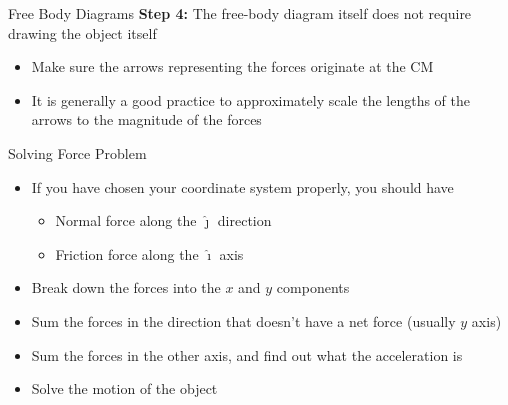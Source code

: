 \documentclass[12pt,compress,aspectratio=169]{beamer}
\newcommand{\mb}[1]{\ensuremath\mathbf{#1}}
\begin{document}
\begin{frame}{Free Body Diagrams}
  \textbf{Step 4:} The free-body diagram itself does not require drawing the
  object itself
  \begin{itemize}
  \item Make sure the arrows representing the forces originate at the CM
  \item It is generally a good practice to approximately scale the lengths of
    the arrows to the magnitude of the forces
  \end{itemize}

  \begin{center}
  \end{center}
\end{frame}



\begin{frame}{Solving Force Problem}
  \begin{itemize}
  \item If you have chosen your coordinate system properly, you should have
    \begin{itemize}
    \item Normal force along the $\bm{\hat{\jmath}}$ direction
    \item Friction force along the $\bm{\hat{\imath}}$ axis      
    \end{itemize}
  \item Break down the forces into the $x$ and $y$ components
  \item Sum the forces in the direction that doesn't have a net force (usually
    $y$ axis)
  \item Sum the forces in the other axis, and find out what the acceleration is
  \item Solve the motion of the object
  \end{itemize}
\end{frame}
\end{document}
